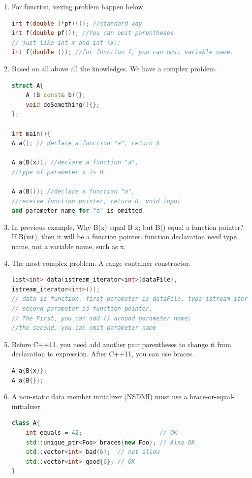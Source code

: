 \documentclass[a4paper,11pt,twoside]{book}
\begin{document}
\begin{enumerate}
	\item For function, vexing problem happen below.
\begin{lstlisting}[frame=single, language=c++, mathescape=true]
int f(double (*pf)()); //standard way
int f(double pf()); //You can omit parentheses
// just like int x and int (x);
int f(double ()); //for function f, you can omit variable name.                 
\end{lstlisting}
	
	\item Based on all above all the knowledges. We have a complex problem.
\begin{lstlisting}[frame=single, language=c++, mathescape=true]
struct A{
	A (B const& b){};
	void doSomething(){};
};
	
int main(){    
A a(); // declare a function "a", return A
	
A a(B(x)); //declare a function "a",   
//type of parameter x is B

A a(B()); //declare a function "a",
//receive function pointer, return B, void input
and parameter name for "a" is omitted.   
\end{lstlisting}
	
	\item In previous example, Why B(x) equal B x; but B() equal a function pointer? If B(int), then it will be a function pointer.  function declaration need type name, not a variable name, such as x.
	
	\item The most complex problem. A range container constructor. 
\begin{lstlisting}[frame=single, language=c++, mathescape=true]
list<int> data(istream_iterator<int>(dataFile), 
istream_iterator<int>()); 
// data is function. first parameter is dataFile, type istream_iterator<int>
// second parameter is function pointer. 
// The First, you can add () around parameter name; 
//the second, you can omit parameter name
\end{lstlisting}
	
	\item Before C++11, you need add another pair parentheses to change it from declaration to expression. After C++11, you can use braces.
\begin{lstlisting}[frame=single, language=c++, mathescape=true]
A a{B{x}}; 
A a{B{}};
\end{lstlisting} 
	
	\item A non-static data member initializer (NSDMI) must use a brace-or-equal-initializer.
\begin{lstlisting}[frame=single, language=c++, mathescape=true]
class A{
	int equals = 42;                      // OK
	std::unique_ptr<Foo> braces{new Foo}; // Also OK
	std::vector<int> bad(6);  // not allow
	std::vector<int> good{6}; // OK  
}  
\end{lstlisting}
	

\end{enumerate}
\end{document}
